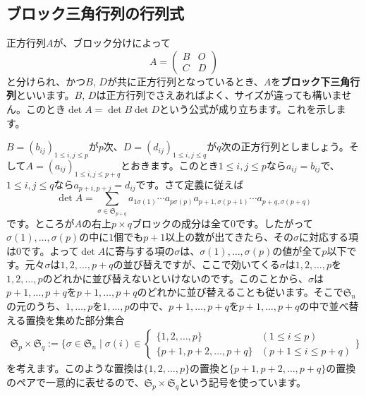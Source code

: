 \subsection{ブロック三角行列の行列式}
正方行列$A$が、ブロック分けによって
\[
A = 
\begin{pmatrix}
B & O \\
C & D
\end{pmatrix}
\]
と分けられ、かつ$B$, $D$が共に正方行列となっているとき、$A$を\textbf{ブロック下三角行列}といいます。$B$, $D$は正方行列でさえあればよく、サイズが違っても構いません。このとき$\det A = \det B \det D$という公式が成り立ちます。これを示します。

$B = (b_{ij})_{1 \leq i, j \leq p}$が$p$次、$D = (d_{ij})_{1 \leq i, j \leq q}$が$q$次の正方行列としましょう。そして$A = (a_{ij})_{1 \leq i, j \leq p + q}$とおきます。このとき$1 \leq i, j \leq p$なら$a_{ij} = b_{ij}$で、$1 \leq i, j \leq q$なら$a_{p + i, p + j} = d_{ij}$です。さて定義に従えば
\[
\det A =
\sum_{\sigma \in \mathfrak{S}_{p + q}} a_{1\sigma(1)} \cdots a_{p\sigma(p)} a_{p + 1, \sigma(p + 1)} \cdots a_{p + q, \sigma(p + q)}
\]
です。ところが$A$の右上$p\times q$ブロックの成分は全て$0$です。したがって$\sigma(1), \ldots, \sigma(p)$の中に$1$個でも$p + 1$以上の数が出てきたら、その$\sigma$に対応する項は$0$です。よって$\det A$に寄与する項の$\sigma$は、$\sigma(1), \ldots, \sigma(p)$の値が全て$p$以下です。元々$\sigma$は$1, 2, \ldots, p+q$の並び替えですが、ここで効いてくる$\sigma$は$1, 2, \ldots, p$を$1, 2, \ldots, p$のどれかに並び替えないといけないのです。このことから、$\sigma$は$p + 1, \ldots, p + q$を$p + 1, \ldots, p + q$のどれかに並び替えることも従います。そこで$\mathfrak{S}_n$の元のうち、$1, \ldots, p$を$1, \ldots, p$の中で、$p + 1, \ldots, p + q$を$p + 1, \ldots, p + q$の中で並べ替える置換を集めた部分集合
\begin{align*}
\mathfrak{S}_p \times \mathfrak{S}_q
:= \Biggl\{ \sigma \in \mathfrak{S}_n \mid \sigma(i) \in
\begin{cases}
\{1, 2 ,\ldots, p\} & (1 \leq i \leq p) \\
\{p + 1, p + 2 ,\ldots, p + q\} & (p + 1 \leq i \leq p +q)
\end{cases}
\Biggr\}
\end{align*}
を考えます。このような置換は$\{1, 2, \ldots, p\}$の置換と$\{p + 1, p + 2, \ldots, p + q\}$の置換のペアで一意的に表せるので、$\mathfrak{S}_p \times \mathfrak{S}_q$という記号を使っています。

